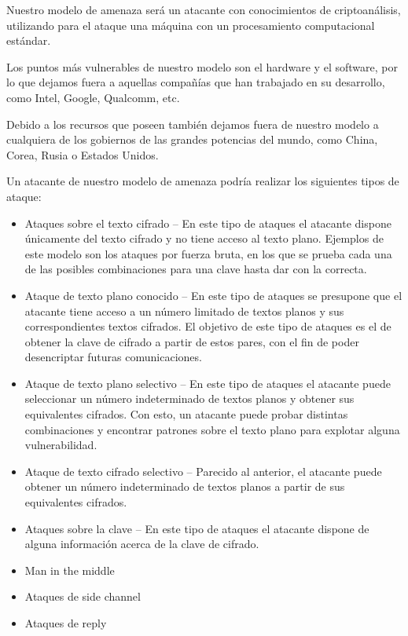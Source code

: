 Nuestro modelo de amenaza será un atacante con conocimientos de criptoanálisis,
utilizando para el ataque una máquina con un procesamiento computacional estándar.

Los puntos más vulnerables de nuestro modelo son el hardware y el software, por
lo que dejamos fuera a aquellas compañías que han trabajado en su desarrollo,
como Intel, Google, Qualcomm, etc.

Debido a los recursos que poseen también dejamos fuera de nuestro modelo a
cualquiera de los gobiernos de las grandes potencias del mundo, como China, Corea,
Rusia o Estados Unidos.

Un atacante de nuestro modelo de amenaza podría realizar los siguientes tipos de ataque:

\begin{itemize}
  \item Ataques sobre el texto cifrado -- En este tipo de ataques el atacante
  dispone únicamente del texto cifrado y no tiene acceso al texto plano.
  Ejemplos de este modelo son los ataques por fuerza bruta, en los que se prueba
  cada una de las posibles combinaciones para una clave hasta dar con la correcta.

  \item Ataque de texto plano conocido -- En este tipo de ataques se presupone
  que el atacante tiene acceso a un número limitado de textos planos y sus
  correspondientes textos cifrados. El objetivo de este tipo de ataques es el de
  obtener la clave de cifrado a partir de estos pares, con el fin de poder
  desencriptar futuras comunicaciones.

  \item Ataque de texto plano selectivo -- En este tipo de ataques el atacante puede
  seleccionar un número indeterminado de textos planos y obtener sus equivalentes
  cifrados. Con esto, un atacante puede probar distintas combinaciones y encontrar
  patrones sobre el texto plano para explotar alguna vulnerabilidad.

  \item Ataque de texto cifrado selectivo -- Parecido al anterior, el atacante
  puede obtener un número indeterminado de textos planos a partir de sus
  equivalentes cifrados.

  \item Ataques sobre la clave -- En este tipo de ataques el atacante dispone de
  alguna información acerca de la clave de cifrado.

  \item Man in the middle

  \item Ataques de side channel

  \item Ataques de reply
\end{itemize} \emph{\parencite{Reference20}}\\
